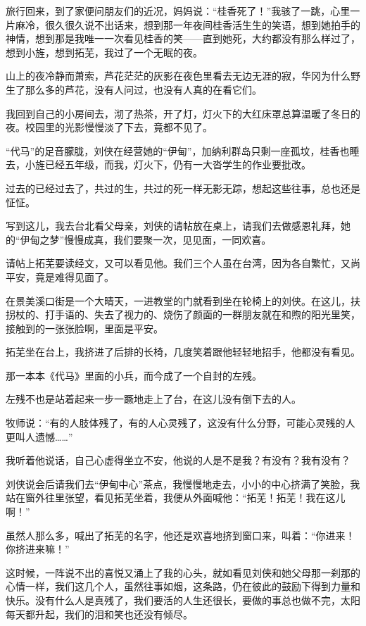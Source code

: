 \par 旅行回来，到了家便问朋友们的近况，妈妈说：“桂香死了！”我骇了一跳，心里一片麻冷，很久很久说不出话来，想到那一年夜间桂香活生生的笑语，想到她拍手的神情，想到那是我唯一一次看见桂香的笑——直到她死，大约都没有那么样过了，想到小旌，想到拓芜，我过了一个无眠的夜。
\par 山上的夜冷静而萧索，芦花茫茫的灰影在夜色里看去无边无涯的寂，华冈为什么野生了那么多的芦花，没有人问过，也没有人真的在看它们。
\par 我回到自己的小房间去，沏了热茶，开了灯，灯火下的大红床罩总算温暖了冬日的夜。校园里的光影慢慢淡了下去，竟都不见了。
\par “代马”的足音朦胧，刘侠在经营她的“伊甸”，加纳利群岛只剩一座孤坟，桂香也睡去，小旌已经五年级，而我，灯火下，仍有一大沓学生的作业要批改。
\par 过去的已经过去了，共过的生，共过的死一样无影无踪，想起这些往事，总也还是怔怔。
\par 写到这儿，我去台北看父母亲，刘侠的请帖放在桌上，请我们去做感恩礼拜，她的“伊甸之梦”慢慢成真，我们要聚一次，见见面，一同欢喜。
\par 请帖上拓芜要读经文，又可以看见他。我们三个人虽在台湾，因为各自繁忙，又尚平安，竟是难得见面了。
\par 在景美溪口街是一个大晴天，一进教堂的门就看到坐在轮椅上的刘侠。在这儿，扶拐杖的、打手语的、失去了视力的、烧伤了颜面的一群朋友就在和煦的阳光里笑，接触到的一张张脸啊，里面是平安。
\par 拓芜坐在台上，我挤进了后排的长椅，几度笑着跟他轻轻地招手，他都没有看见。
\par 那一本本《代马》里面的小兵，而今成了一个自封的左残。
\par 左残不也是站着起来一步一蹶地走上了台，在这儿没有倒下去的人。
\par 牧师说：“有的人肢体残了，有的人心灵残了，这没有什么分野，可能心灵残的人更叫人遗憾……”
\par 我听着他说话，自己心虚得坐立不安，他说的人是不是我？有没有？我有没有？
\par 刘侠说会后请我们去“伊甸中心”茶点，我慢慢地走去，小小的中心挤满了笑脸，我站在窗外往里张望，看见拓芜坐着，我便从外面喊他：“拓芜！拓芜！我在这儿啊！”
\par 虽然人那么多，喊出了拓芜的名字，他还是欢喜地挤到窗口来，叫着：“你进来！你挤进来嘛！”
\par 这时候，一阵说不出的喜悦又涌上了我的心头，就如看见刘侠和她父母那一刹那的心情一样，我们这几个人，虽然往事如烟，这条路，仍在彼此的鼓励下得到力量和快乐。没有什么人是真残了，我们要活的人生还很长，要做的事总也做不完，太阳每天都升起，我们的泪和笑也还没有倾尽。
